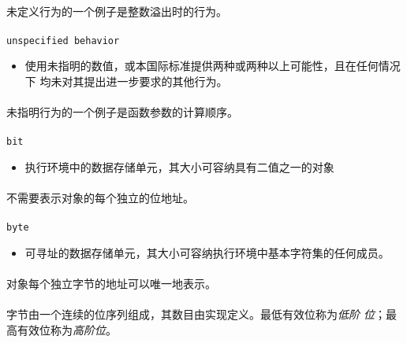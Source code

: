 \paragraph{}
\ex* 未定义行为的一个例子是整数溢出时的行为。

\paragraph{}
\texttt{unspecified behavior}
\begin{itemize}
  \item[]{使用未指明的数值，或本国际标准提供两种或两种以上可能性，且在任何情况下
    均未对其提出进一步要求的其他行为。}
\end{itemize}

\paragraph{}
\ex* 未指明行为的一个例子是函数参数的计算顺序。

\paragraph{}
\texttt{bit}
\begin{itemize}
  \item[]{执行环境中的数据存储单元，其大小可容纳具有二值之一的对象}
\end{itemize}

\paragraph{}
\notes* 不需要表示对象的每个独立的位地址。

\paragraph{}
\texttt{byte}
\begin{itemize}
  \item[]{可寻址的数据存储单元，其大小可容纳执行环境中基本字符集的任何成员。}
\end{itemize}

\paragraph{}
\notes 对象每个独立字节的地址可以唯一地表示。

\paragraph{}
\notes 字节由一个连续的位序列组成，其数目由实现定义。最低有效位称为\textit{低阶
位}；最高有效位称为\textit{高阶位}。

